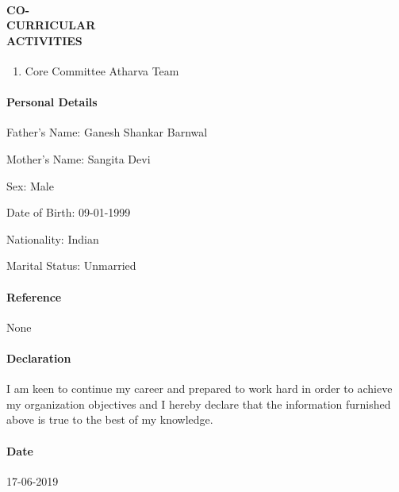 \documentclass{article}
\begin{document}
\paragraph{\textbf{CO-\\CURRICULAR\\ACTIVITIES }}
	\begin{enumerate}
		\item Core Committee Atharva Team
	\end{enumerate}
\paragraph{\textbf{Personal Details}}
	\begin{description}
		\item Father's Name: Ganesh Shankar Barnwal
		\item Mother's Name: Sangita Devi
		\item Sex: Male
		\item Date of Birth: 09-01-1999
		\item Nationality: Indian
		\item Marital Status: Unmarried
	\end{description}
\paragraph{\textbf{Reference}}
None
\paragraph{\textbf{Declaration}}
I am keen to continue my career and prepared to work hard in order to achieve my organization objectives and I hereby declare that the information furnished above is true to the best of my knowledge.
\paragraph{\textbf{Date}}
17-06-2019
\end{document}

